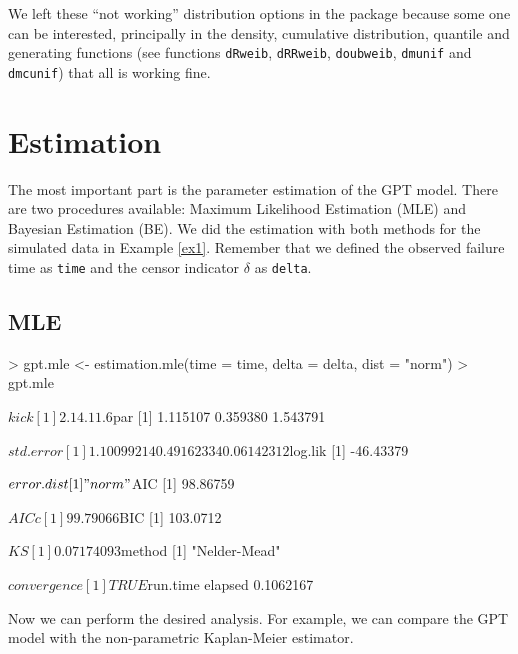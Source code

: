\documentclass[nogin,letterpaper,12pt]{article}
\begin{document}
We left these ``not working'' distribution options in the package because some one can be interested, principally in the density, cumulative distribution, quantile and generating functions (see functions \verb=dRweib=, \verb=dRRweib=, \verb=doubweib=, \verb=dmunif= and \verb=dmcunif=) that all is working fine.

\section{Estimation}

The most important part is the parameter estimation of the GPT model. There are two procedures available: Maximum Likelihood Estimation (MLE) and Bayesian Estimation (BE). We did the estimation with both methods for the simulated data in Example \ref{ex1}. Remember that we defined the observed failure time as \verb=time= and the censor indicator $\delta$ as \verb=delta=.

\subsection{MLE}
\begin{Schunk}
\begin{Sinput}
> gpt.mle <- estimation.mle(time = time, delta = delta, dist = "norm")
> gpt.mle
\end{Sinput}
\begin{Soutput}
$kick
[1] 2.1 4.1 1.6

$par
[1] 1.115107 0.359380 1.543791

$std.error
[1] 1.10099214 0.49162334 0.06142312

$log.lik
[1] -46.43379

$error.dist
[1] "norm"

$AIC
[1] 98.86759

$AICc
[1] 99.79066

$BIC
[1] 103.0712

$KS
[1] 0.07174093

$method
[1] "Nelder-Mead"

$convergence
[1] TRUE

$run.time
  elapsed 
0.1062167 
\end{Soutput}
\end{Schunk}

Now we can perform the desired analysis. For example, we can compare the GPT model with the non-parametric Kaplan-Meier estimator.
\end{document}
